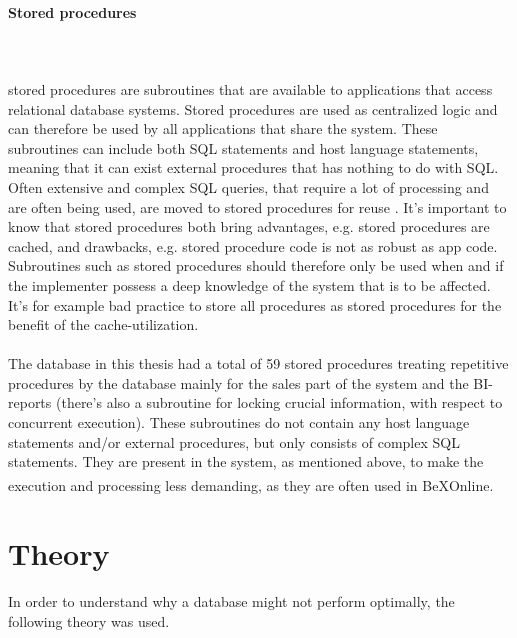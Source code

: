 \documentclass{cslthse-msc}
\newcommand{\bex}{BeX\textsuperscript{\textregistered}}
\begin{document}
\paragraph*{Stored procedures}\mbox{}\\\\ 
stored procedures are subroutines that are available to applications that access relational database systems. Stored procedures are used as centralized logic and can therefore be used by all applications that share the system. These subroutines can include both SQL statements and host language statements, meaning that it can exist external procedures that has nothing to do with SQL. Often extensive and complex SQL queries, that require a lot of processing and are often being used, are moved to stored procedures for reuse   \cite{StoredProcedures}. It's important to know that stored procedures both bring advantages, e.g. stored procedures are cached, and drawbacks, e.g. stored procedure code is not as robust as app code. Subroutines such as stored procedures should therefore only be used when and if the implementer possess a deep knowledge of the system that is to be affected. It's for example bad practice to store all procedures as stored procedures for the benefit of the cache-utilization.\\\\
The database in this thesis had a total of 59 stored procedures treating repetitive procedures by the database mainly for the sales part of the system and the BI-reports (there's also a subroutine for locking crucial information, with respect to concurrent execution). These subroutines do not contain any host language statements and/or external procedures, but only consists of complex SQL statements. They are present in the system, as mentioned above, to make the execution and processing less demanding, as they are often used in \bex Online.

 
\section{Theory}\label{sec:theory}
In order to understand why a database might not perform optimally, the following theory was used.
\end{document}
